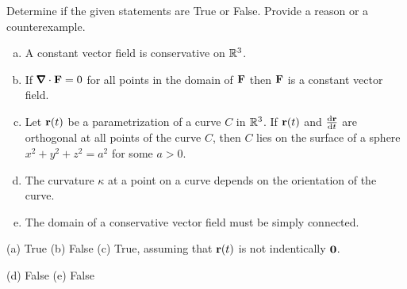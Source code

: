 \begin{question}[M317 2011A] %
Determine if the given statements are True or False. Provide a reason or a counterexample.
\begin{enumerate}[(a)]
\item
A constant vector field is conservative on $\mathbb{R}^3$.
\item
If $\vnabla\cdot\vF= 0$ for all points in the domain of $\mathbf{F}$
then $\mathbf{F}$ is a constant vector field.
\item
Let $\mathbf{r}(t)$  be a parametrization of a curve $C$ in $\mathbb{R}^3$.
If $\mathbf{r}(t)$ and $\diff{\vr}{t}$ are orthogonal at all
points of the curve $C$, then $C$ lies on the surface of a sphere 
$x^2 + y^2 + z^2 = a^2$ for some $a>0$.
\item
The curvature $\kappa$ at a point on a curve depends on the orientation 
of the curve.
\item
The domain of a conservative vector field must be simply connected.

\end{enumerate}
\end{question}

%

\begin{answer} 
(a) True\qquad
(b) False\qquad
(c) True, assuming that $\mathbf{r}(t)$ is not indentically $\mathbf{0}$.

(d) False\qquad
(e) False 
\end{answer}

